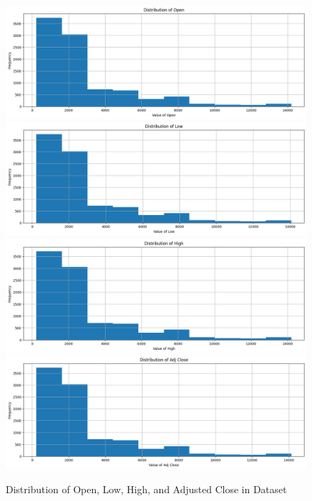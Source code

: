 \documentclass[a4paper, 11pt]{article}
\begin{document}
\begin{figure}[H]
    \begin{center}
        \includegraphics[width=1\textwidth]{Distribution of Open.png}
        \includegraphics[width=1\textwidth]{Distribution of Low.png}
        \includegraphics[width=1\textwidth]{Distribution of High.png}
        \includegraphics[width=1\textwidth]{Distribution of Adjusted Close.png}
        \caption{Distribution of Open, Low, High, and Adjusted Close in Dataset}
    \end{center}
\end{figure}
\end{document}

